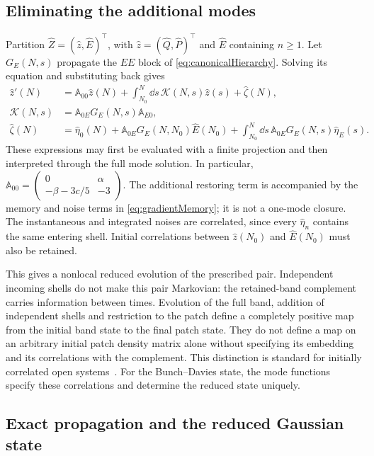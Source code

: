 \documentclass{article}
\numberwithin{equation}{section}
\begin{document}
\subsection{Eliminating the additional modes}

Partition $\hat Z=(\hat z,\hat E)^\top$, with $\hat z=(\hat Q,\hat P)^\top$ and $\hat E$ containing $n\geq1$. Let $G_E(N,s)$ propagate the $EE$ block of \cref{eq:canonicalHierarchy}. Solving its equation and substituting back gives
\begin{subequations}\label{eq:gradientMemory}
\begin{align}
 \hat z'(N)&=\mathbb A_{00}\hat z(N)+\int_{N_0}^N\dd s\,\mathcal K(N,s)\hat z(s)+\hat\zeta(N),\\
 \mathcal K(N,s)&=\mathbb A_{0E}G_E(N,s)\mathbb A_{E0},\\
 \hat\zeta(N)&=\hat\eta_0(N)+\mathbb A_{0E}G_E(N,N_0)\hat E(N_0)
 +\int_{N_0}^N\dd s\,\mathbb A_{0E}G_E(N,s)\hat\eta_E(s).
\end{align}
\end{subequations}
These expressions may first be evaluated with a finite projection and then interpreted through the full mode solution. In particular, $\mathbb A_{00}=\left(\begin{smallmatrix}0&\alpha\\-\beta-3c/5&-3\end{smallmatrix}\right)$. The additional restoring term is accompanied by the memory and noise terms in \cref{eq:gradientMemory}; it is not a one-mode closure. The instantaneous and integrated noises are correlated, since every $\hat\eta_n$ contains the same entering shell. Initial correlations between $\hat z(N_0)$ and $\hat E(N_0)$ must also be retained.

This gives a nonlocal reduced evolution of the prescribed pair. Independent incoming shells do not make this pair Markovian: the retained-band complement carries information between times. Evolution of the full band, addition of independent shells and restriction to the patch define a completely positive map from the initial band state to the final patch state. They do not define a map on an arbitrary initial patch density matrix alone without specifying its embedding and its correlations with the complement. This distinction is standard for initially correlated open systems~\cite{Dominy2016CP}. For the Bunch--Davies state, the mode functions specify these correlations and determine the reduced state uniquely.

\subsection{Exact propagation and the reduced Gaussian state}
\end{document}
